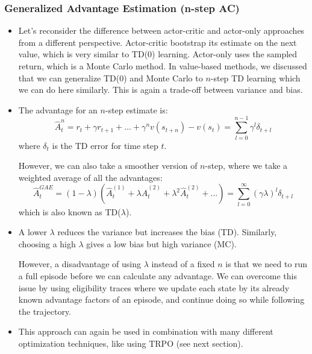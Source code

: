 \subsubsection{Generalized Advantage Estimation (n-step AC)}
\begin{itemize}
	\item Let's reconsider the difference between actor-critic and actor-only approaches from a different perspective. Actor-critic bootstrap its estimate on the next value, which is very similar to TD(0) learning. Actor-only uses the sampled return, which is a Monte Carlo method. In value-based methods, we discussed that we can generalize TD(0) and Monte Carlo to $n$-step TD learning which we can do here similarly. This is again a trade-off between variance and bias. %
	\item The advantage for an $n$-step estimate is:
	$$\hat{A}_t^n = r_t + \gamma r_{t+1} + ... + \gamma^n v(s_{t+n}) - v(s_t) = \sum_{l=0}^{n-1}\gamma^{l}\delta_{t+l}$$
	where $\delta_{t}$ is the TD error for time step $t$. 
	 
	However, we can also take a smoother version of $n$-step, where we take a weighted average of all the advantages:
	$$\hat{A}_t^{GAE} = (1-\lambda)\left(\hat{A}_t^{(1)} + \lambda \hat{A}_t^{(2)} + \lambda^2 \hat{A}_t^{(2)} + ...\right) = \sum_{l=0}^{\infty} (\gamma \lambda)^{l}\delta_{t+l}$$
	which is also known as TD($\lambda$).
	\item A lower $\lambda$ reduces the variance but increases the bias (TD). Similarly, choosing a high $\lambda$ gives a low bias but high variance (MC).
	
	However, a disadvantage of using $\lambda$ instead of a fixed $n$ is that we need to run a full episode before we can calculate any advantage. We can overcome this issue by using eligibility traces where we update each state by its already known advantage factors of an episode, and continue doing so while following the trajectory.
	\item This approach can again be used in combination with many different optimization techniques, like using TRPO (see next section). 
\end{itemize}
